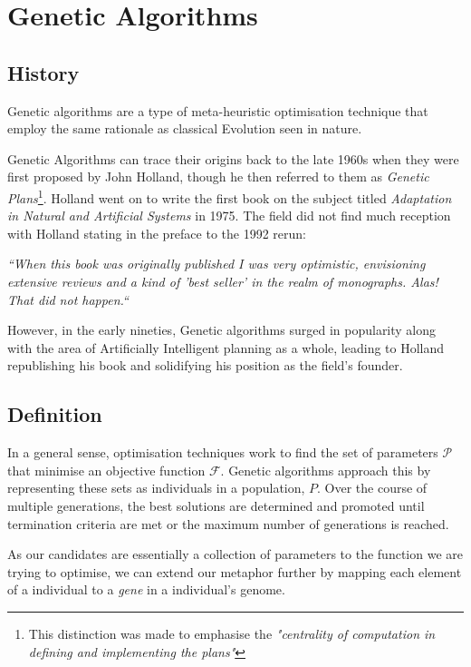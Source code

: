 \section{Genetic Algorithms}

\subsection{History}

Genetic algorithms are a type of meta-heuristic optimisation technique that employ the same rationale as classical Evolution seen in nature.

Genetic Algorithms can trace their origins back to the late 1960s when they were first proposed by John Holland, though he then referred to them as \textit{Genetic Plans}\footnote{This distinction was made to emphasise the \textit{"centrality of computation in defining and implementing the plans"}\cite{hollandAdaptationNaturalArtificial1992}}. Holland went on to write the first book on the subject titled \textit{Adaptation in Natural and Artificial Systems}\cite{hollandAdaptationNaturalArtificial1992} in 1975. The field did not find much reception with Holland stating in the preface to the 1992 rerun:

\begin{displayquote}
\textit{``When this book was originally published I was very optimistic, envisioning extensive reviews and a kind of 'best seller' in the realm of monographs. Alas! That did not happen.``}
\end{displayquote}

However, in the early nineties, Genetic algorithms surged in popularity along with the area of Artificially Intelligent planning as a whole, leading to Holland republishing his book and solidifying his position as the field's founder.

\subsection{Definition}
In a general sense, optimisation techniques work to find the set of parameters $\mathcal{P}$ that minimise an objective function $\mathcal{F}$. 
Genetic algorithms approach this by representing these sets as individuals in a population, $P$. Over the course of multiple generations, the best solutions are determined and promoted until termination criteria are met or the maximum number of generations is reached.

As our candidates are essentially a collection of parameters to the function we are trying to optimise, we can extend our metaphor further by mapping each element of a individual to a \textit{gene} in a individual's genome. 

